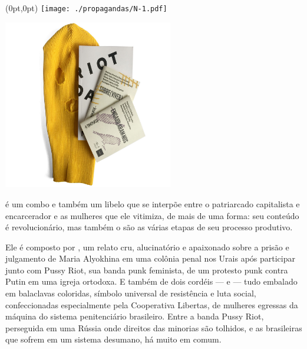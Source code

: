 \pagestyle{n-1}
\label{n-1}

\begin{textblock*}{5.625in}(0pt,0pt)%
\vspace*{-3.5cm}
\hspace*{-2.77cm}\texttt{[image: ./propagandas/N-1.pdf]}
\end{textblock*}

\pagebreak %

\begin{center}
\hspace*{-3.6cm}
\hspace*{3.1cm}\includegraphics[width=74mm]{./grid/riot.jpg}
\end{center}

\hspace*{-7cm}\hrulefill\hspace*{-7cm}

\medskip

 é um combo e também um libelo que se interpõe entre o patriarcado capitalista e encarcerador e as mulheres que ele vitimiza, de mais de uma forma: seu conteúdo é revolucionário, mas também o são as várias etapas de seu processo produtivo.

Ele é composto por {}, um relato cru, alucinatório e apaixonado sobre a prisão e julgamento de Maria Alyokhina em uma colônia penal nos Urais após participar junto com Pussy Riot, sua banda punk feminista, de um protesto punk contra Putin em uma igreja ortodoxa.
E também de dois cordéis --- {} e {} --- tudo embalado em balaclavas coloridas, símbolo universal de resistência e luta social, confeccionadas especialmente pela Cooperativa Libertas, de mulheres egressas da máquina do sistema penitenciário brasileiro. Entre a banda Pussy Riot, perseguida em uma Rússia onde direitos das minorias são tolhidos, e as brasileiras que sofrem em um sistema desumano, há muito em comum. 

